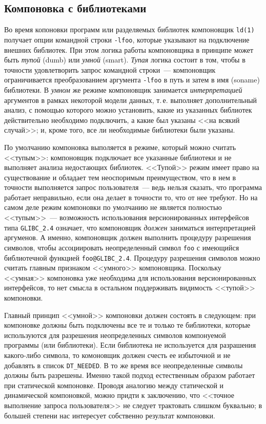 \documentclass[russian,a4paper,12pt,titlepage]{article}
\begin{document}
\subsection{Компоновка с библиотеками}
\label{linking-with-libraries}
Во время копоновки программ или разделяемых библиотек компоновщик \verb|ld(1)| получает опции командной строки \verb|-lfoo|,
которые указывают на подключение внешних библиотек.  При этом логика работы компоновщика в принципе может быть \emph{тупой} (dumb)
или \emph{умной} (smart).  \emph{Тупая} логика состоит в том, чтобы в точности удовлетворить запрос командной строки~--- компоновщик
ограничивается преобразованием аргумента \verb|-lfoo| в путь и затем в имя (soname) библиотеки.  В \emph{умном} же режиме компоновщик
занимается \emph{интерпретацией} аргументов в рамках некоторой модели данных, т.\,е. выполняет дополнительный анализ, с помощью которого
можно установить, какие из указанных библиотек действительно необходимо подключить, а какие был указаны <<на всякий случай>>;
и, кроме того, все ли необходимые библиотеки были указаны.

По умолчанию компоновка выполяется в режиме, который можно считать <<тупым>>: компоновщик подключает все указанные библиотеки
и не выполняет анализа недостающих библиотек.  <<Тупой>> режим имеет право на существование и обладает тем неоспоримым преимуществом,
что в нем в точности выполняется запрос пользователя~--- ведь нельзя сказать, что программа работает неправильно, если она делает
в точности то, что от нее требуют.  Но на самом деле режим компоновки по умолчанию не является полностью <<тупым>>~--- возможность
использования версионированных интерфейсов типа \verb|GLIBC_2.4| означает, что компоновщик \emph{должен} заниматься интерпретацией
аргуменов.  А именно, компоновщик должен выполнить процедуру разрешения символов, чтобы ассоциировать неопределенный символ
\verb|foo| с имеющийся библиотечной функцией \verb|foo@GLIBC_2.4|.  Процедуру разрешения символов можно считать главным признаком
<<умного>> компоновщика.  Поскольку <<умная>> компоновка уже необходима для использования версионированных интерфейсов, то нет смысла
в остальном поддерживать видимость <<тупой>> компоновки.

Главный принцип <<умной>> компоновки должен состоять в следующем: при компоновке должны быть подключены все те и только те библиотеки,
которые используются для разрешения неопределенных символов компонуемой программы (или библиотеки).  Если библиотека не используется
для разрашения какого-либо символа, то комоновщик должен счесть ее избыточной и не добавлять в список \verb|DT_NEEDED|.
В то же время все неопределенные символы должны быть разрешены.  Именно такой подход естественным образом работает
при статической компоновке.  Проводя аналогию между статической и динамической компоновкой, можно придти к заключению,
что <<точное выполнение запроса пользователя>> не следует трактовать слишком буквально; в большей степени нас интересует
собственно результат компоновки.
\end{document}
